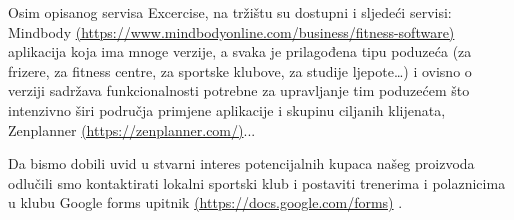         {Osim opisanog servisa Excercise, na tržištu su dostupni i sljedeći servisi: Mindbody \href{https://www.mindbodyonline.com/business/fitness-software}{(https://www.mindbodyonline.com/business/fitness-software)} aplikacija koja ima mnoge verzije, a svaka je prilagođena tipu poduzeća (za frizere, za fitness centre, za sportske klubove, za studije ljepote…) i ovisno o verziji sadržava funkcionalnosti potrebne za upravljanje tim poduzećem što intenzivno širi područja primjene aplikacije i skupinu ciljanih klijenata, Zenplanner \href{https://zenplanner.com/}{(https://zenplanner.com/)}... \\ }

        {Da bismo dobili uvid u stvarni interes potencijalnih kupaca našeg proizvoda odlučili smo kontaktirati lokalni sportski klub i postaviti trenerima i polaznicima u klubu Google forms upitnik \href{https://docs.google.com/forms/d/e/1FAIpQLSenHBNtxCLnlzAUZP_xeXSPl-oNTVsIt4iL1JYWlX9hdUSjcg/viewform?usp=sf_link}{(https://docs.google.com/forms)} .\\ }

